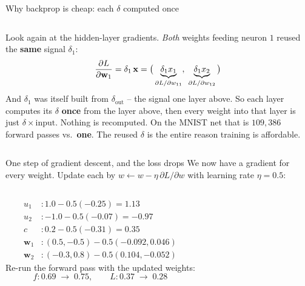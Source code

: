 \documentclass[aspectratio=169]{beamer}
\begin{document}
\begin{frame}{Why backprop is cheap: each $\delta$ computed once}
  \begin{columns}[T]
    Look again at the hidden-layer gradients. \emph{Both} weights feeding neuron $1$ reused
    the \textbf{same} signal $\delta_1$:
    \[
      \frac{\partial L}{\partial \mathbf{w}_1} = \delta_1\,\mathbf{x}
      = \big(\underbrace{\delta_1 x_1}_{\partial L/\partial w_{11}},\;
             \underbrace{\delta_1 x_2}_{\partial L/\partial w_{12}}\big)
    \]
    And $\delta_1$ was itself built from $\delta_{\text{out}}$ -- the signal one layer above.
    \vskip 4pt
    So each layer computes its $\delta$ \textbf{once} from the layer above, then every weight
    into that layer is just $\delta \times \text{input}$. Nothing is recomputed.
    \vskip 4pt
    \footnotesize On the MNIST net that is $109{,}386$ forward passes vs.\ \textbf{one}. The
    reused $\delta$ is the entire reason training is affordable.
  \end{columns}
\end{frame}

\begin{frame}{One step of gradient descent, and the loss drops}
  We now have a gradient for every weight. Update each by $w \leftarrow w - \eta\,\partial
  L/\partial w$ with learning rate $\eta = 0.5$:
  \vfill
  \begin{columns}[T]
    \footnotesize
    \begin{align*}
      u_1 &: 1.0 - 0.5(-0.25) = 1.13\\
      u_2 &: -1.0 - 0.5(-0.07) = -0.97\\
      c &: 0.2 - 0.5(-0.31) = 0.35\\
      \mathbf{w}_1 &: (0.5,-0.5) - 0.5(-0.092,0.046)\\
      \mathbf{w}_2 &: (-0.3,0.8) - 0.5(0.104,-0.052)
    \end{align*}
    Re-run the forward pass with the updated weights:
    \[
      f: 0.69 \;\to\; 0.75, \qquad L: 0.37 \;\to\; 0.28
    \]
  \end{columns}
\end{frame}
\end{document}
